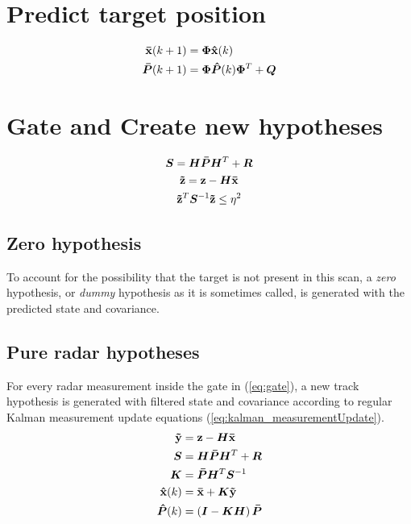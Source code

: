 \section{Predict target position}
\begin{equation}
\begin{split}
\boldsymbol{\mathbf{\bar{x}}}(k+1) 	&= \bm{\Phi} \boldsymbol{\mathbf{\hat{x}}}(k) \\
\bm{\bar{P}}(k+1)	&= \bm{\Phi} \bm{\hat{P}}(k)  \bm{\Phi}^T + \bm{Q} \\
\end{split}
\label{eq:kalman_timeUpdate}
\end{equation}

\section{Gate and Create new hypotheses}
\begin{equation}
\begin{gathered}
\bm{S}	= \bm{H} \bm{\bar{P}} \bm{H}^T + \bm{R} \\
\boldsymbol{\mathbf{\tilde{z}}} = \boldsymbol{\mathbf{z}} - \bm{H}\boldsymbol{\mathbf{\bar{x}}} \\
\boldsymbol{\mathbf{\tilde{z}}}^T	\bm{S}^{-1} \boldsymbol{\mathbf{\tilde{z}}} \leq \eta^2
\label{eq:gate}
\end{gathered}
\end{equation}

\subsection{Zero hypothesis}
To account for the possibility that the target is not present in this scan, a \emph{zero} hypothesis, or \emph{dummy} hypothesis as it is sometimes called, is generated with the predicted state and covariance.

\subsection{Pure radar hypotheses}
For every radar measurement inside the gate in (\ref{eq:gate}), a new track hypothesis is generated with filtered state and covariance according to regular Kalman measurement update equations (\ref{eq:kalman_measurementUpdate}).
\begin{equation}
\begin{split}
\boldsymbol{\mathbf{\tilde{y}}}	&= \boldsymbol{\mathbf{z}} - \bm{H} \boldsymbol{\mathbf{\bar{x}}} \\
\bm{S}			&= \bm{H} \bm{\bar{P}} \bm{H}^T + \bm{R} \\
\bm{K} 			&= \bm{\bar{P}} \bm{H}^T \bm{S}^{-1} \\
\boldsymbol{\mathbf{\hat{x}}}(k) 	&= \boldsymbol{\mathbf{\bar{x}}} + \bm{K} \boldsymbol{\mathbf{\tilde{y}}} \\
\bm{\hat{P}}(k) 	&= \left( \bm{I} - \bm{K} \bm{H} \right) \bm{\bar{P}}
\end{split}
\label{eq:kalman_measurementUpdate}
\end{equation}

